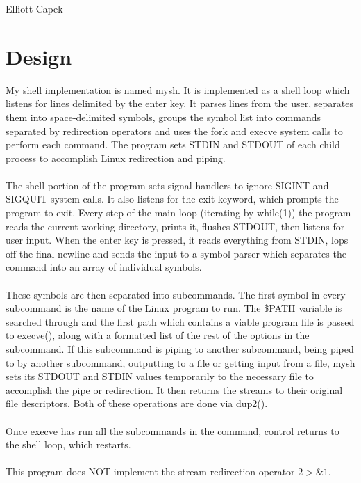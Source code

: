 \documentclass[11pt]{article}
\begin{document}
Elliott Capek \\

\section{Design}
My shell implementation is named mysh. It is implemented as a shell loop which listens for lines delimited by the enter key. It parses lines from the user, 
separates them into space-delimited symbols, groups the symbol list into commands separated by redirection operators and uses the fork and execve
system calls to perform each command. The program sets STDIN and STDOUT of each child process to accomplish Linux redirection and piping.\\ \\
The shell portion of the program sets signal handlers to ignore SIGINT and SIGQUIT system calls. It also listens for the exit keyword, which prompts the 
program to exit. Every step of the main loop (iterating by while(1)) the program reads the current working directory, prints it, flushes STDOUT, then listens for
user input. When the enter key is pressed, it reads everything from STDIN, lops off the final newline and sends the input to a symbol parser which separates the
command into an array of individual symbols. \\ \\
These symbols are then separated into subcommands. The first symbol in every subcommand is the name of the Linux program to run. The \${PATH} variable is searched
through and the first path which contains a viable program file is passed to execve(), along with a formatted list of the rest of the options in the subcommand.
If this subcommand is piping to another subcommand, being piped to by another subcommand, outputting to a file or getting input from a file, mysh sets its 
STDOUT and STDIN values temporarily to the necessary file to accomplish the pipe or redirection. It then returns the streams to their original file descriptors.
Both of these operations are done via dup2(). \\ \\
Once execve has run all the subcommands in the command, control returns to the shell loop, which restarts. \\ \\
This program does NOT implement the stream redirection operator $2>\&1$. 
\end{document}
